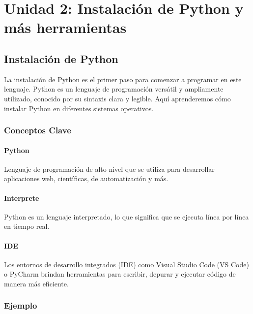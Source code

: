 \documentclass[
  a4paper,
  onepage,
  openany]{scrreprt}
\begin{document}
\part{Unidad 2: Instalación de Python y más herramientas}

\hypertarget{instalaciuxf3n-de-python}{%
\chapter{Instalación de Python}\label{instalaciuxf3n-de-python}}

La instalación de Python es el primer paso para comenzar a programar en
este lenguaje. Python es un lenguaje de programación versátil y
ampliamente utilizado, conocido por su sintaxis clara y legible. Aquí
aprenderemos cómo instalar Python en diferentes sistemas operativos.

\hypertarget{conceptos-clave-2}{%
\section{Conceptos Clave}\label{conceptos-clave-2}}

\hypertarget{python}{%
\subsection{Python}\label{python}}

Lenguaje de programación de alto nivel que se utiliza para desarrollar
aplicaciones web, científicas, de automatización y más.

\hypertarget{interprete}{%
\subsection{Interprete}\label{interprete}}

Python es un lenguaje interpretado, lo que significa que se ejecuta
línea por línea en tiempo real.

\hypertarget{ide}{%
\subsection{IDE}\label{ide}}

Los entornos de desarrollo integrados (IDE) como Visual Studio Code (VS
Code) o PyCharm brindan herramientas para escribir, depurar y ejecutar
código de manera más eficiente.

\hypertarget{ejemplo-2}{%
\section{Ejemplo}\label{ejemplo-2}}
\end{document}
